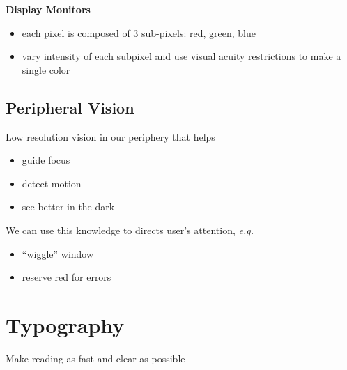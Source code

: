 \documentclass[]{article}
\theoremstyle{definition}
\begin{document}
	\textbf{Display Monitors}
	\begin{itemize}
		\item each pixel is composed of 3 sub-pixels: red, green, blue
		\item vary intensity of each subpixel and use visual acuity restrictions to make a single color
	\end{itemize}

	\subsection{Peripheral Vision}
	Low resolution vision in our periphery that helps
	\begin{itemize}
		\item guide focus
		\item detect motion
		\item see better in the dark
	\end{itemize}
	We can use this knowledge to directs user's attention, \textit{e.g.}
	\begin{itemize}
		\item ``wiggle'' window
		\item reserve red for errors
	\end{itemize}

	\section{Typography}
	Make reading as fast and clear as possible
\end{document}
